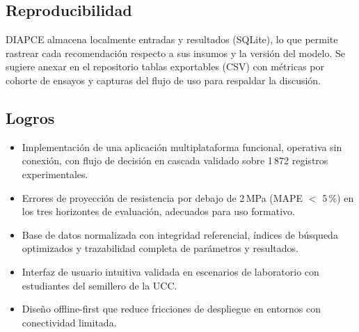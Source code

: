 \subsection{Reproducibilidad}

DIAPCE almacena localmente entradas y resultados (SQLite), lo que permite rastrear cada recomendación respecto a sus insumos y la versión del modelo. Se sugiere anexar en el repositorio tablas exportables (CSV) con métricas por cohorte de ensayos y capturas del flujo de uso para respaldar la discusión.

\subsection{Logros}

\begin{itemize}
  \item Implementación de una aplicación multiplataforma funcional, operativa sin conexión, con flujo de decisión en cascada validado sobre 1\,872 registros experimentales.
  \item Errores de proyección de resistencia por debajo de 2\,MPa (MAPE $<$ 5\,\%) en los tres horizontes de evaluación, adecuados para uso formativo.
  \item Base de datos normalizada con integridad referencial, índices de búsqueda optimizados y trazabilidad completa de parámetros y resultados.
  \item Interfaz de usuario intuitiva validada en escenarios de laboratorio con estudiantes del semillero de la UCC.
  \item Diseño offline-first que reduce fricciones de despliegue en entornos con conectividad limitada.
\end{itemize}
